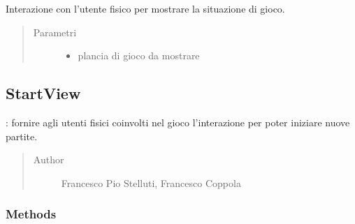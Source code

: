 \documentclass[letterpaper,10pt,italian,openany,oneside]{sphinxmanual}
\begin{document}
\begin{fulllineitems}
\label{\detokenize{source/it/unicam/cs/pa/mastermind/ui/GameView:it.unicam.cs.pa.mastermind.ui.GameView.showGame(BoardModel)}}
Interazione con l’utente fisico per mostrare la situazione di gioco.
\begin{quote}\begin{description}
\item[{Parametri}] \leavevmode\begin{itemize}
\item {} 
 \textendash{} plancia di gioco da mostrare

\end{itemize}

\end{description}\end{quote}

\end{fulllineitems}



\subsection{StartView}
\label{\detokenize{source/it/unicam/cs/pa/mastermind/ui/StartView:startview}}\label{\detokenize{source/it/unicam/cs/pa/mastermind/ui/StartView::doc}}

\begin{fulllineitems}
\label{\detokenize{source/it/unicam/cs/pa/mastermind/ui/StartView:it.unicam.cs.pa.mastermind.ui.StartView}}
: fornire agli utenti fisici coinvolti nel gioco l’interazione per poter iniziare nuove partite.
\begin{quote}\begin{description}
\item[{Author}] \leavevmode
Francesco Pio Stelluti, Francesco Coppola

\end{description}\end{quote}

\end{fulllineitems}



\subsubsection{Methods}
\label{\detokenize{source/it/unicam/cs/pa/mastermind/ui/StartView:methods}}
\end{document}
